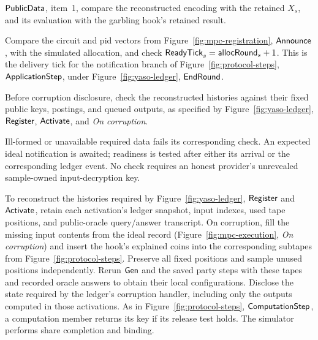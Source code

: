 \begin{description}
 $\mathsf{PublicData}$, item~1, compare the reconstructed encoding with the
 retained $X_s$, and its evaluation with the garbling hook's retained
 result.
 \item[$\PO{8}$: announcements.]\label{po:announcements}
 Compare the circuit and pid vectors from
 Figure~\ref{fig:mpc-registration}, $\mathsf{Announce}$, with the simulated
 allocation, and check $\mathsf{ReadyTick}_s=\mathsf{allocRound}_s+1$.
 This is the delivery tick for the notification branch of
 Figure~\ref{fig:protocol-steps}, $\mathsf{ApplicationStep}$, under
 Figure~\ref{fig:yaso-ledger}, $\mathsf{EndRound}$.
 \item[$\PO{9}$: disclosed histories.]\label{po:histories}
 Before corruption disclosure, check the reconstructed histories against
 their fixed public keys, postings, and queued outputs, as specified by
 Figure~\ref{fig:yaso-ledger}, $\mathsf{Register}$, $\mathsf{Activate}$, and
 \emph{On corruption}.
\end{description}
Ill-formed or unavailable required data fails its corresponding check.
An expected ideal notification is awaited; readiness is tested after
either its arrival or the corresponding ledger event.  No check requires
an honest provider's unrevealed sample-owned input-decryption key.

To reconstruct the histories required by Figure~\ref{fig:yaso-ledger},
$\mathsf{Register}$ and $\mathsf{Activate}$, retain each activation's ledger snapshot,
input indexes, used tape positions, and public-oracle query/answer
transcript.
On corruption, fill the missing input contents from the ideal record
(Figure~\ref{fig:mpc-execution}, \emph{On corruption}) and insert the
hook's explained coins into the corresponding subtapes from
Figure~\ref{fig:protocol-steps}.  Preserve all fixed positions and sample
unused positions independently.  Rerun $\mathsf{Gen}$ and the saved party steps
with these tapes and recorded oracle answers to obtain their local
configurations.  Disclose the
state required by the ledger's corruption handler, including only the
outputs computed in those activations.  As in Figure~\ref{fig:protocol-steps},
$\mathsf{ComputationStep}$, a computation member returns its key if its release
test holds.  The simulator performs share completion and binding.
